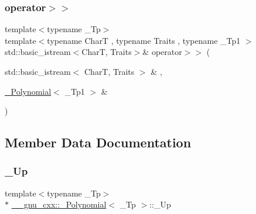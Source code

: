 \subsubsection{\texorpdfstring{operator$>$$>$}{operator>>}}
{\footnotesize\ttfamily template$<$typename \+\_\+\+Tp$>$ \\
template$<$typename CharT , typename Traits , typename \+\_\+\+Tp1 $>$ \\
std\+::basic\+\_\+istream$<$CharT, Traits$>$\& operator$>$$>$ (\begin{DoxyParamCaption}\item[{std\+::basic\+\_\+istream$<$ CharT, Traits $>$ \&}]{,  }\item[{\hyperlink{class____gnu__cxx_1_1__Polynomial}{\+\_\+\+Polynomial}$<$ \+\_\+\+Tp1 $>$ \&}]{ }\end{DoxyParamCaption})\hspace{0.3cm}{\ttfamily [friend]}}



\subsection{Member Data Documentation}
\mbox{\label{class____gnu__cxx_1_1__Polynomial_a242114d4b86648a5dff67a8221f80d40}} 
\subsubsection{\texorpdfstring{\+\_\+\+Up}{\_Up}}
{\footnotesize\ttfamily template$<$typename \+\_\+\+Tp$>$ \\
$\ast$ \hyperlink{class____gnu__cxx_1_1__Polynomial}{\+\_\+\+\_\+gnu\+\_\+cxx\+::\+\_\+\+Polynomial}$<$ \+\_\+\+Tp $>$\+::\+\_\+\+Up}

